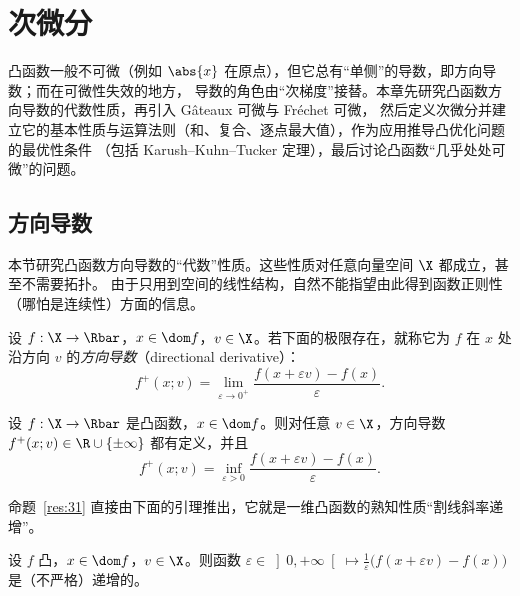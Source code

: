 \chapter{次微分}
\label{ch:ch03}

凸函数一般不可微（例如 $\abs{x}$ 在原点），但它总有“单侧”的导数，即方向导数；而在可微性失效的地方，
导数的角色由“次梯度”接替。本章先研究凸函数方向导数的代数性质，再引入 Gâteaux 可微与 Fréchet 可微，
然后定义次微分并建立它的基本性质与运算法则（和、复合、逐点最大值），作为应用推导凸优化问题的最优性条件
（包括 Karush--Kuhn--Tucker 定理），最后讨论凸函数“几乎处处可微”的问题。

\section{方向导数}

本节研究凸函数方向导数的“代数”性质。这些性质对任意向量空间 $\X$ 都成立，甚至不需要拓扑。
由于只用到空间的线性结构，自然不能指望由此得到函数正则性（哪怕是连续性）方面的信息。

\begin{definition}[方向导数]
\label{def:21}
设 $f:\X\to\Rbar$，$x\in\dom f$，$v\in\X$。若下面的极限存在，就称它为 $f$ 在 $x$ 处沿方向 $v$ 的\emph{方向导数}（directional derivative）：
\begin{equation}
  f^+(x;v)=\lim_{\varepsilon\to0^+}\frac{f(x+\varepsilon v)-f(x)}{\varepsilon}.
  \label{eq:7}
\end{equation}
\end{definition}

\begin{proposition}
\label{res:31}
设 $f:\X\to\Rbar$ 是凸函数，$x\in\dom f$。则对任意 $v\in\X$，方向导数 $f^+(x;v)\in\R\cup\{\pm\infty\}$ 都有定义，并且
\begin{equation}
  f^+(x;v)=\inf_{\varepsilon>0}\frac{f(x+\varepsilon v)-f(x)}{\varepsilon}.
  \label{eq:8}
\end{equation}
\end{proposition}

命题~\ref{res:31} 直接由下面的引理推出，它就是一维凸函数的熟知性质“割线斜率递增”。

\begin{lemma}
\label{res:32}
设 $f$ 凸，$x\in\dom f$，$v\in\X$。则函数 $\varepsilon\in\left]0,+\infty\right[\mapsto\frac1\varepsilon\bigl(f(x+\varepsilon v)-f(x)\bigr)$ 是（不严格）递增的。
\end{lemma}

